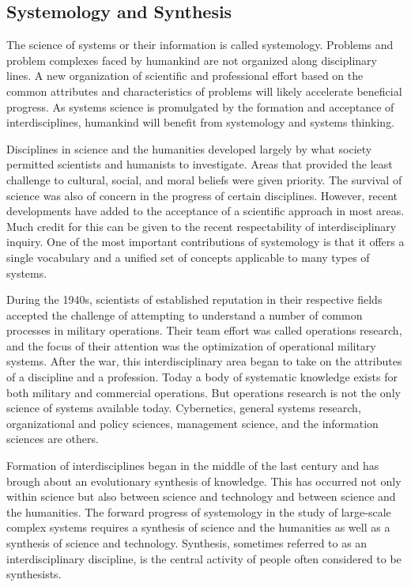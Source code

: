 \subsection{Systemology and Synthesis}

The science of systems or their information is called systemology. Problems and problem complexes faced by humankind are not organized along disciplinary lines. A new organization of scientific and professional effort based on the common attributes and characteristics of problems will likely accelerate beneficial progress. As systems science is promulgated by the formation and acceptance of interdisciplines, humankind will benefit from systemology and systems thinking.

Disciplines in science and the humanities developed largely by what society permitted scientists and humanists to investigate. Areas that provided the least challenge to cultural, social, and moral beliefs were given priority. The survival of science was also of concern in the progress of certain disciplines. However, recent developments have added to the acceptance of a scientific approach in most areas. Much credit for this can be given to the recent respectability of interdisciplinary inquiry. One of the most important contributions of systemology is that it offers a single vocabulary and a unified set of concepts applicable to many types of systems.

During the 1940s, scientists of established reputation in their respective fields accepted the challenge of attempting to understand a number of common processes in military operations. Their team effort was called operations research, and the focus of their attention was the optimization of operational military systems. After the war, this interdisciplinary area began to take on the attributes of a discipline and a profession. Today a body of systematic knowledge exists for both military and commercial operations. But operations research is not the only science of systems available today. Cybernetics, general systems research, organizational and policy sciences, management science, and the information sciences are others.

Formation of interdisciplines began in the middle of the last century and has brough about an evolutionary synthesis of knowledge. This has occurred not only within science but also between science and technology and between science and the humanities. The forward progress of systemology in the study of large-scale complex systems requires a synthesis of science and the humanities as well as a synthesis of science and technology. Synthesis, sometimes referred to as an interdisciplinary discipline, is the central activity of people often considered to be synthesists.

